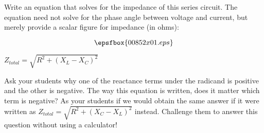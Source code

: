 

Write an equation that solves for the impedance of this series circuit.  The equation need not solve for the phase angle between voltage and current, but merely provide a scalar figure for impedance (in ohms):

$$\epsfbox{00852x01.eps}$$







$Z_{total} = \sqrt{R^2 + (X_L - X_C)^2}$







Ask your students why one of the reactance terms under the radicand is positive and the other is negative.  The way this equation is written, does it matter which term is negative?  As your students if we would obtain the same answer if it were written as $Z_{total} = \sqrt{R^2 + (X_C - X_L)^2}$ instead.  Challenge them to answer this question without using a calculator!




